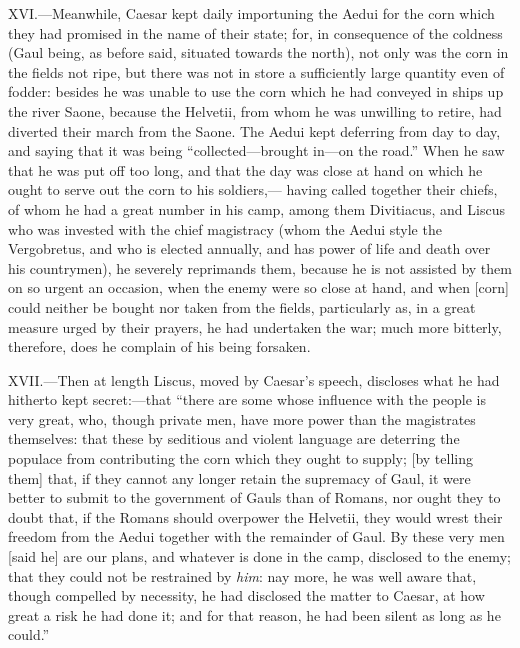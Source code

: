 XVI.—Meanwhile, Caesar kept daily importuning the Aedui for the corn
which they had promised in the name of their state; for, in consequence
of the coldness (Gaul being, as before said, situated towards the
north), not only was the corn in the fields not ripe, but there was not
in store a sufficiently large quantity even of fodder: besides he was
unable to use the corn which he had conveyed in ships up the river
Saone, because the Helvetii, from whom he was unwilling to retire, had
diverted their march from the Saone. The Aedui kept deferring from day
to day, and saying that it was being ``collected—brought in—on the
road.'' When he saw that he was put off too long, and that the day was
close at hand on which he ought to serve out the corn to his soldiers,—
having called together their chiefs, of whom he had a great number in
his camp, among them Divitiacus, and Liscus who was invested with the
chief magistracy (whom the Aedui style the Vergobretus, and who is
elected annually, and has power of life and death over his countrymen),
he severely reprimands them, because he is not assisted by them on so
urgent an occasion, when the enemy were so close at hand, and when
[corn] could neither be bought nor taken from the fields, particularly
as, in a great measure urged by their prayers, he had undertaken the
war; much more bitterly, therefore, does he complain of his being
forsaken.

XVII.—Then at length Liscus, moved by Caesar's speech, discloses what
he had hitherto kept secret:—that ``there are some whose influence with
the people is very great, who, though private men, have more power than
the magistrates themselves: that these by seditious and violent language
are deterring the populace from contributing the corn which they ought
to supply; [by telling them] that, if they cannot any longer retain the
supremacy of Gaul, it were better to submit to the government of Gauls
than of Romans, nor ought they to doubt that, if the Romans should
overpower the Helvetii, they would wrest their freedom from the Aedui
together with the remainder of Gaul. By these very men [said he] are our
plans, and whatever is done in the camp, disclosed to the enemy; that
they could not be restrained by \emph{him}: nay more, he was well aware that,
though compelled by necessity, he had disclosed the matter to Caesar, at
how great a risk he had done it; and for that reason, he had been silent
as long as he could.''

